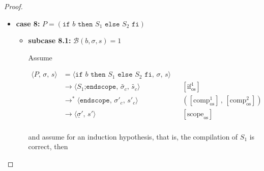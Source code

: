 \documentclass{article}
\begin{document}
\begin{proof}
\begin{itemize}
\begin{itemize}
        \end{itemize}

    \item \textbf{case 8:} $P = (\texttt{if } b \texttt{ then } S_1 \texttt{ else } S_2 \texttt{ fi})$\\

    \begin{itemize}
            \item \textbf{subcase 8.1:} $\mathcal{B}(b, \sigma, s) = 1$

            Assume

                \[
                  \begin{aligned}
                  \langle P,\, \sigma,\, s \rangle
                  &=\langle \texttt{if } b \texttt{ then } S_1 \texttt{ else } S_2 \texttt{ fi},\, \sigma,\, s \rangle \\
                  &\rightarrow \langle S_1\texttt{;endscope},\, \tilde{\sigma_c} ,\, \tilde{s_c} \rangle
                  && [\text{if}^1_{\text{os}}]   \\
                  &\rightarrow^\ast \langle \texttt{endscope},\, \sigma'_c ,\, s'_c \rangle 
                  && ([\text{comp}^1_{\text{os}}] \,,\, [\text{comp}^2_{\text{os}}])   \\
                  &\rightarrow \langle \underline{\sigma}' ,\, s' \rangle
                  && [\text{scope}_{\text{os}}]   \\
                  \end{aligned}
              \]

            and assume for an induction hypothesis, that is, the compilation of $S_1$ is correct, then


\end{itemize}
\end{itemize}
\end{proof}
\end{document}
